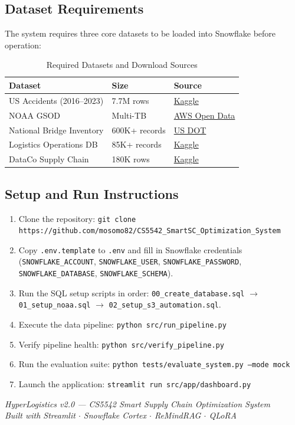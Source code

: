 \documentclass[11pt,letterpaper]{article}
\begin{document}
\subsection{Dataset Requirements}
The system requires three core datasets to be loaded into Snowflake before operation:

\begin{table}[H]
\centering
\caption{Required Datasets and Download Sources}
\label{tab:datasets}
\begin{tabular}{lll}
\toprule
\textbf{Dataset} & \textbf{Size} & \textbf{Source} \\
\midrule
US Accidents (2016--2023) & 7.7M rows & \href{https://www.kaggle.com/datasets/sobhanmoosavi/us-accidents}{Kaggle} \\
NOAA GSOD & Multi-TB & \href{https://registry.opendata.aws/noaa-gsod/}{AWS Open Data} \\
National Bridge Inventory & 600K+ records & \href{https://geodata.bts.gov/datasets/national-bridge-inventory/}{US DOT} \\
Logistics Operations DB & 85K+ records & \href{https://www.kaggle.com/datasets/yogape/logistics-operations-database}{Kaggle} \\
DataCo Supply Chain & 180K rows & \href{https://www.kaggle.com/datasets/shashwatwork/dataco-smart-supply-chain-for-big-data-analysis}{Kaggle} \\
\bottomrule
\end{tabular}
\end{table}

\subsection{Setup and Run Instructions}
\begin{enumerate}[nosep]
  \item Clone the repository: \texttt{git clone https://github.com/mosomo82/CS5542\_SmartSC\_Optimization\_System}
  \item Copy \texttt{.env.template} to \texttt{.env} and fill in Snowflake credentials (\texttt{SNOWFLAKE\_ACCOUNT}, \texttt{SNOWFLAKE\_USER}, \texttt{SNOWFLAKE\_PASSWORD}, \texttt{SNOWFLAKE\_DATABASE}, \texttt{SNOWFLAKE\_SCHEMA}).
  \item Run the SQL setup scripts in order: \texttt{00\_create\_database.sql} $\rightarrow$ \texttt{01\_setup\_noaa.sql} $\rightarrow$ \texttt{02\_setup\_s3\_automation.sql}.
  \item Execute the data pipeline: \texttt{python src/run\_pipeline.py}
  \item Verify pipeline health: \texttt{python src/verify\_pipeline.py}
  \item Run the evaluation suite: \texttt{python tests/evaluate\_system.py --mode mock}
  \item Launch the application: \texttt{streamlit run src/app/dashboard.py}
\end{enumerate}

\vfill
\begin{center}
\small
\textit{HyperLogistics v2.0 --- CS5542 Smart Supply Chain Optimization System} \\
\textit{Built with Streamlit $\cdot$ Snowflake Cortex $\cdot$ ReMindRAG $\cdot$ QLoRA}
\end{center}
\end{document}
